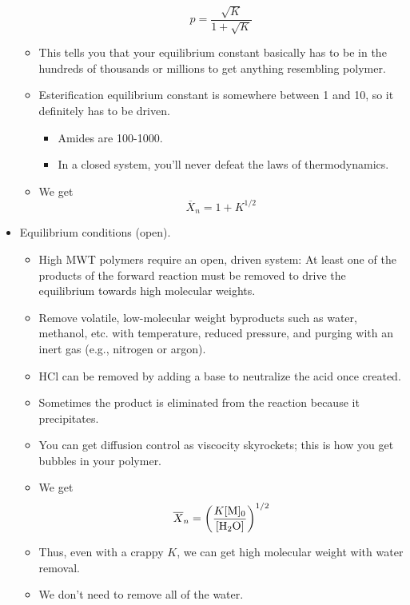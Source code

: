 \documentclass[../notes.tex]{subfiles}
\begin{document}
\begin{itemize}
\begin{itemize}
        \begin{equation*}
            p = \frac{\sqrt{K}}{1+\sqrt{K}}
        \end{equation*}
        \item This tells you that your equilibrium constant basically has to be in the hundreds of thousands or millions to get anything resembling polymer.
        \item Esterification equilibrium constant is somewhere between 1 and 10, so it definitely has to be driven.
        \begin{itemize}
            \item Amides are 100-1000.
            \item In a closed system, you'll never defeat the laws of thermodynamics.
        \end{itemize}
        \item We get
        \begin{equation*}
            \overline{X}_n = 1+K^{1/2}
        \end{equation*}
    \end{itemize}
    \item Equilibrium conditions (open).
    \begin{itemize}
        \item High MWT polymers require an open, driven system: At least one of the products of the forward reaction must be removed to drive the equilibrium towards high molecular weights.
        \item Remove volatile, low-molecular weight byproducts such as water, methanol, etc. with temperature, reduced pressure, and purging with an inert gas (e.g., nitrogen or argon).
        \item HCl can be removed by adding a base to neutralize the acid once created.
        \item Sometimes the product is eliminated from the reaction because it precipitates.
        \item You can get diffusion control as viscocity skyrockets; this is how you get bubbles in your polymer.
        \item We get
        \begin{equation*}
            \overline{X}_n = \left( \frac{K[\ce{M}]_0}{[\ce{H2O}]} \right)^{1/2}
        \end{equation*}
        \item Thus, even with a crappy $K$, we can get high molecular weight with water removal.
        \item We don't need to remove all of the water.

\end{itemize}
\end{itemize}
\end{document}
